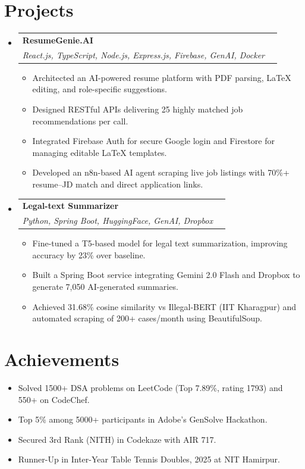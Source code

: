\documentclass[a4paper,11pt]{article}
\makeatletter
\newcommand{\resumeSubheading}[4]{
  \item
  \begin{tabular*}{\textwidth}{l@{\extracolsep{\fill}}r}
    \textbf{#1} & #2 \\
    \textit{#3} & \textit{#4} \\
  \end{tabular*}\vspace{-6pt}
}
\newcommand{\resumeItem}[1]{
  \item \small{#1 \vspace{-2pt}}
}
\makeatother
\begin{document}
\section{Projects}
\begin{itemize}

  \resumeSubheading
    {ResumeGenie.AI}{}
    {React.js, TypeScript, Node.js, Express.js, Firebase, GenAI, Docker}{}

  \begin{itemize}
    \resumeItem{Architected an AI-powered resume platform with PDF parsing, LaTeX editing, and role-specific suggestions.}
    \resumeItem{Designed RESTful APIs delivering 25 highly matched job recommendations per call.}
    \resumeItem{Integrated Firebase Auth for secure Google login and Firestore for managing editable LaTeX templates.}
    \resumeItem{Developed an n8n-based AI agent scraping live job listings with 70\%+ resume–JD match and direct application links.}
  \end{itemize}

  \resumeSubheading
    {Legal-text Summarizer}{}
    {Python, Spring Boot, HuggingFace, GenAI, Dropbox}{}

  \begin{itemize}
    \resumeItem{Fine-tuned a T5-based model for legal text summarization, improving accuracy by 23\% over baseline.}
    \resumeItem{Built a Spring Boot service integrating Gemini 2.0 Flash and Dropbox to generate 7,050 AI-generated summaries.}
    \resumeItem{Achieved 31.68\% cosine similarity vs Illegal-BERT (IIT Kharagpur) and automated scraping of 200+ cases/month using BeautifulSoup.}
  \end{itemize}

\end{itemize}

\section{Achievements}
\begin{itemize}
  \item \small{Solved 1500+ DSA problems on LeetCode (Top 7.89\%, rating 1793) and 550+ on CodeChef.}
  \item \small{Top 5\% among 5000+ participants in Adobe’s GenSolve Hackathon.}
  \item \small{Secured 3rd Rank (NITH) in Codekaze with AIR 717.}
  \item \small{Runner-Up in Inter-Year Table Tennis Doubles, 2025 at NIT Hamirpur.}
\end{itemize}
\end{document}
